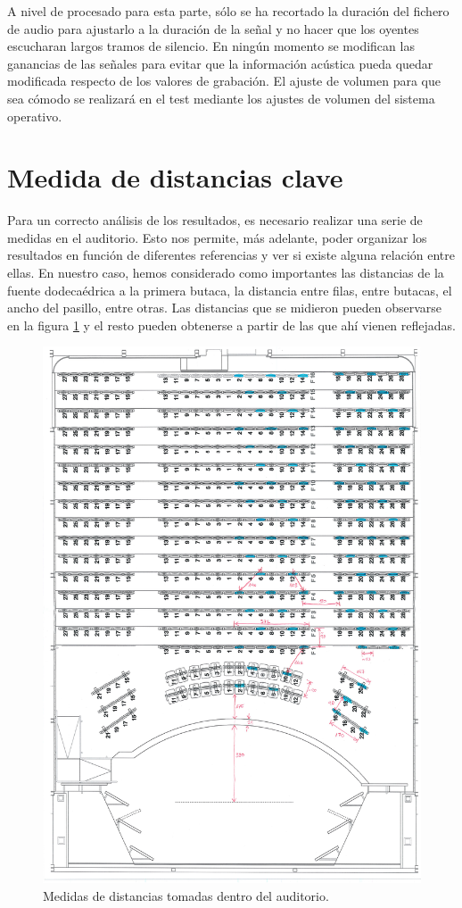\documentclass[11pt,a4paper,twoside]{book}
\begin{document}
            A nivel de procesado para esta parte, sólo se ha recortado la duración del fichero de audio para ajustarlo a la duración de la señal y no hacer que los oyentes escucharan largos tramos de silencio. En ningún momento se modifican las ganancias de las señales para evitar que la información acústica pueda quedar modificada respecto de los valores de grabación. El ajuste de volumen para que sea cómodo se realizará en el test mediante los ajustes de volumen del sistema operativo.
            
    \section{Medida de distancias clave}
        Para un correcto análisis de los resultados, es necesario realizar una serie de medidas en el auditorio. Esto nos permite, más adelante, poder organizar los resultados en función de diferentes referencias y ver si existe alguna relación entre ellas. En nuestro caso, hemos considerado como importantes las distancias de la fuente dodecaédrica a la primera butaca, la distancia entre filas, entre butacas, el ancho del pasillo, entre otras. Las distancias que se midieron pueden observarse en la figura \ref{fig:distancias} y el resto pueden obtenerse a partir de las que ahí vienen reflejadas.
        
        \begin{figure}
                \includegraphics[scale=0.4]{../imagenes/AuditorioMedidasButacas.pdf}
                \centering
                \caption{Medidas de distancias tomadas dentro del auditorio.}
                \label{fig:distancias}
            \end{figure}
        
    
\end{document}
